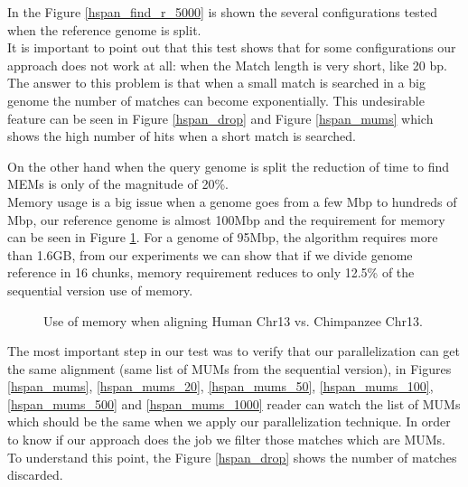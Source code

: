 \documentclass[twocolumn,twoside]{Jornadas}
\begin{document}
In the Figure \ref{hspan_find_r_5000} is shown the several configurations tested when the reference genome is split. \\
It is important to point out that this test shows that for some configurations our approach does not work at all: when the Match length is very short, like 20 bp. The answer to this problem is that when a small match is searched in a big genome the number of matches can become exponentially. This undesirable feature can be seen in Figure \ref{hspan_drop} and Figure \ref{hspan_mums} which shows the high number of hits when a short match is searched.\\
\begin{figure}[htb] 
\centering
{}
\hspace{0.1cm}
\end{figure}
On the other hand when the query genome is split the reduction of time to find MEMs is only of the magnitude of 20\%.\\
Memory usage is a big issue when a genome goes from a few Mbp to hundreds of Mbp, our reference genome is almost 100Mbp and the requirement for memory can be seen in Figure \ref{hspan_ram}. For a genome of 95Mbp, the algorithm requires more than 1.6GB, from our experiments we can show that if we divide genome reference in 16 chunks, memory requirement reduces to only 12.5\% of the sequential version use of memory.\\
\begin{figure}[htb] 
\begin{center}
    \caption{Use of memory when aligning Human Chr13 vs. Chimpanzee Chr13.}
    \label{hspan_ram}
  \end{center}
\end{figure}
The most important step in our test was to verify that our parallelization can get the same alignment (same list of MUMs from the sequential version), in Figures \ref{hspan_mums}, \ref{hspan_mums_20}, \ref{hspan_mums_50}, \ref{hspan_mums_100}, \ref{hspan_mums_500} and \ref{hspan_mums_1000} reader can watch the list of MUMs which should be the same when we apply our parallelization technique. In order to know if our approach does the job we filter those matches which are MUMs. To understand this point, the Figure \ref{hspan_drop} shows the number of matches discarded.
\end{document}

